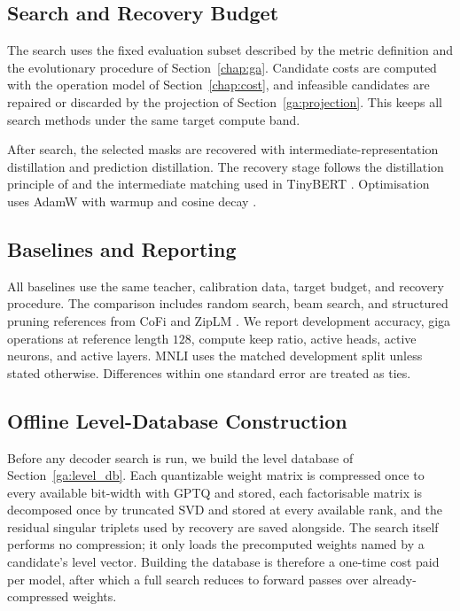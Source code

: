 \subsection{Search and Recovery Budget}

The search uses the fixed evaluation subset described by the metric definition and the evolutionary procedure of Section~\ref{chap:ga}. Candidate costs are computed with the operation model of Section~\ref{chap:cost}, and infeasible candidates are repaired or discarded by the projection of Section~\ref{ga:projection}. This keeps all search methods under the same target compute band.

After search, the selected masks are recovered with intermediate-representation distillation and prediction distillation. The recovery stage follows the distillation principle of \citet{hinton2015distilling} and the intermediate matching used in TinyBERT \citep{jiao2020tinybert}. Optimisation uses AdamW \citep{loshchilov2019adamw} with warmup and cosine decay \citep{loshchilov2017sgdr}.

\subsection{Baselines and Reporting}

All baselines use the same teacher, calibration data, target budget, and recovery procedure. The comparison includes random search, beam search, and structured pruning references from CoFi \citep{xia2022cofi} and ZipLM \citep{kurtic2023ziplm}. We report development accuracy, giga operations at reference length $128$, compute keep ratio, active heads, active neurons, and active layers. MNLI uses the matched development split unless stated otherwise. Differences within one standard error are treated as ties.

\subsection{Offline Level-Database Construction}

Before any decoder search is run, we build the level database of Section~\ref{ga:level_db}. Each quantizable weight matrix is compressed once to every available bit-width with GPTQ and stored, each factorisable matrix is decomposed once by truncated SVD and stored at every available rank, and the residual singular triplets used by recovery are saved alongside. The search itself performs no compression; it only loads the precomputed weights named by a candidate's level vector. Building the database is therefore a one-time cost paid per model, after which a full search reduces to forward passes over already-compressed weights.
